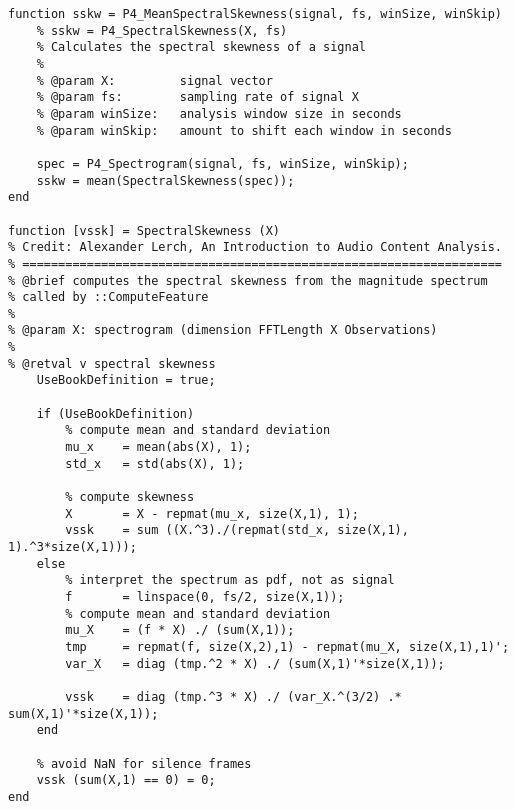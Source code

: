 \begin{lstlisting}[caption=Matlab implementation of the spectral skewness., label=snippet-specskewness]
function sskw = P4_MeanSpectralSkewness(signal, fs, winSize, winSkip)
    % sskw = P4_SpectralSkewness(X, fs)
    % Calculates the spectral skewness of a signal
    %
    % @param X:         signal vector
    % @param fs:        sampling rate of signal X
    % @param winSize:   analysis window size in seconds
    % @param winSkip:   amount to shift each window in seconds
    
    spec = P4_Spectrogram(signal, fs, winSize, winSkip);
    sskw = mean(SpectralSkewness(spec));
end

function [vssk] = SpectralSkewness (X)
% Credit: Alexander Lerch, An Introduction to Audio Content Analysis.
% ===================================================================
% @brief computes the spectral skewness from the magnitude spectrum
% called by ::ComputeFeature
%
% @param X: spectrogram (dimension FFTLength X Observations)
%
% @retval v spectral skewness
    UseBookDefinition = true;
 
    if (UseBookDefinition)
        % compute mean and standard deviation
        mu_x    = mean(abs(X), 1);
        std_x   = std(abs(X), 1);
 
        % compute skewness
        X       = X - repmat(mu_x, size(X,1), 1);
        vssk    = sum ((X.^3)./(repmat(std_x, size(X,1), 1).^3*size(X,1)));
    else
        % interpret the spectrum as pdf, not as signal
        f       = linspace(0, fs/2, size(X,1));
        % compute mean and standard deviation
        mu_X    = (f * X) ./ (sum(X,1));
        tmp     = repmat(f, size(X,2),1) - repmat(mu_X, size(X,1),1)';
        var_X   = diag (tmp.^2 * X) ./ (sum(X,1)'*size(X,1));
 
        vssk    = diag (tmp.^3 * X) ./ (var_X.^(3/2) .* sum(X,1)'*size(X,1));
    end
 
    % avoid NaN for silence frames
    vssk (sum(X,1) == 0) = 0;
end
\end{lstlisting}
